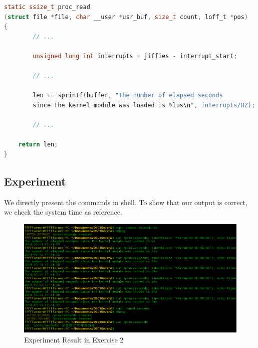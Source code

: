 \documentclass{article}
\begin{document}
    \begin{lstlisting}[language=c, caption={\textbf{proc\_read()}}]
static ssize_t proc_read
(struct file *file, char __user *usr_buf, size_t count, loff_t *pos)
{
        // ...

        unsigned long int interrupts = jiffies - interrupt_start;

        // ...

        len += sprintf(buffer, "The number of elapsed seconds 
        since the kernel module was loaded is %lus\n", interrupts/HZ);

        // ...

	return len;
}
    \end{lstlisting}

    \subsection*{Experiment}
    We directly present the commands in shell. To show that our output is correct, we check the system time as reference.

    \begin{figure}[h]
        \centering
        
        \includegraphics[width=17cm]{seconds}
        \caption{Experiment Result in Exercise 2}
        \label{}
    \end{figure}
\end{document}
